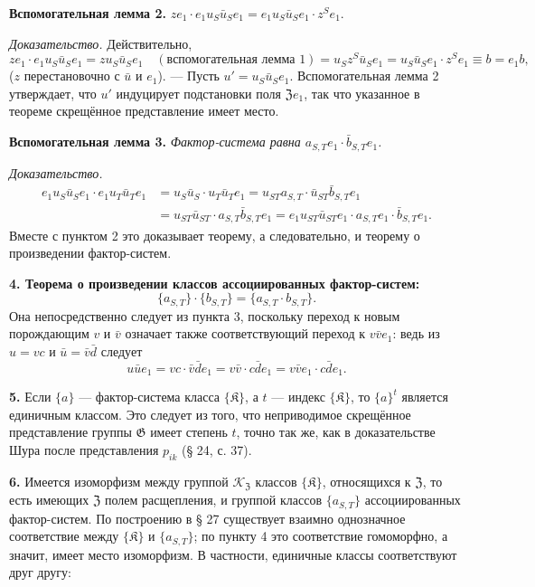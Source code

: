 \documentclass[11pt]{article}
\begin{document}
\noindent\textbf{Вспомогательная лемма 2.} \(ze_1\cdot e_1u_S\bar u_Se_1=e_1u_S\bar u_Se_1\cdot z^Se_1\).

\noindent\emph{Доказательство.} Действительно,
\[
ze_1\cdot e_1u_S\bar u_Se_1
=zu_S\bar u_Se_1\quad(\text{вспомогательная лемма 1})
=u_Sz^S\bar u_Se_1
=u_S\bar u_Se_1\cdot z^Se_1
\equiv b=e_1b,
\]
(\(z\) перестановочно с \(\bar u\) и \(e_1\)). --- Пусть \(u'=u_S\bar u_Se_1\). Вспомогательная лемма 2 утверждает, что \(u'\) индуцирует подстановки поля \(\mathfrak Ze_1\), так что указанное в теореме скрещённое представление имеет место.

\noindent\textbf{Вспомогательная лемма 3.} \emph{Фактор-система равна \(a_{S,T}e_1\cdot\bar b_{S,T}e_1\).}

\noindent\emph{Доказательство.}
\[
\begin{aligned}
e_1u_S\bar u_Se_1\cdot e_1u_T\bar u_Te_1
&=u_S\bar u_S\cdot u_T\bar u_Te_1
 =u_{ST}a_{S,T}\cdot\bar u_{ST}\bar b_{S,T}e_1\\
&=u_{ST}\bar u_{ST}\cdot a_{S,T}\bar b_{S,T}e_1
 =e_1u_{ST}\bar u_{ST}e_1\cdot a_{S,T}e_1\cdot\bar b_{S,T}e_1.
\end{aligned}
\]
Вместе с пунктом 2 это доказывает теорему, а следовательно, и теорему о произведении фактор-систем.

\noindent\textbf{4. Теорема о произведении классов ассоциированных фактор-систем:}
\[
\{a_{S,T}\}\cdot\{b_{S,T}\}=\{a_{S,T}\cdot b_{S,T}\}.
\]
Она непосредственно следует из пункта 3, поскольку переход к новым порождающим \(v\) и \(\bar v\) означает также соответствующий переход к \(v\bar ve_1\): ведь из \(u=vc\) и \(\bar u=\bar v\bar d\) следует
\[
u\bar ue_1=vc\cdot\bar v\bar de_1=v\bar v\cdot c\bar de_1=v\bar ve_1\cdot c\bar de_1.
\]

\noindent\textbf{5.} Если \(\{a\}\) --- фактор-система класса \(\{\mathfrak K\}\), а \(t\) --- индекс \(\{\mathfrak K\}\), то \(\{a\}^t\) является единичным классом. Это следует из того, что неприводимое скрещённое представление группы \(\mathfrak G\) имеет степень \(t\), точно так же, как в доказательстве Шура после представления \(p_{ik}\) (§ 24, с. 37).

\noindent\textbf{6.} Имеется изоморфизм между группой \(\mathscr K_{\mathfrak Z}\) классов \(\{\mathfrak K\}\), относящихся к \(\mathfrak Z\), то есть имеющих \(\mathfrak Z\) полем расщепления, и группой классов \(\{a_{S,T}\}\) ассоциированных фактор-систем. По построению в § 27 существует взаимно однозначное соответствие между \(\{\mathfrak K\}\) и \(\{a_{S,T}\}\); по пункту 4 это соответствие гомоморфно, а значит, имеет место изоморфизм. В частности, единичные классы соответствуют друг другу:
\end{document}
